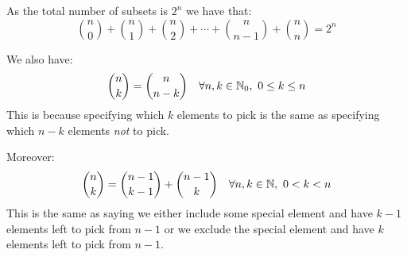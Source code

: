 \documentclass[../main.tex]{subfiles}
\begin{document}
As the total number of subsets is $2^{n}$ we have that:
\[
  \binom{n}{0} + \binom{n}{1} + \binom{n}{2} + \cdots + \binom{n}{n-1} + \binom{n}{n} = 2^{n}
\]

We also have:
\[
  \binom{n}{k} = \binom{n}{n - k} \quad \forall n, k \in \mathbb{N}_0,\ 0 \leq k \leq n
\]
This is because specifying which $k$ elements to pick is the same as specifying which $n - k$ elements \textit{not} to pick.

Moreover:
\[
  \binom{n}{k} = \binom{n - 1}{k - 1} + \binom{n - 1}{k} \quad \forall n, k  \in \mathbb{N},\ 0 < k < n
\]
This is the same as saying we either include some special element and have $k - 1$ elements left to pick from $n - 1$ or we exclude the special element and have $k$ elements left to pick from $n - 1$.
\end{document}
